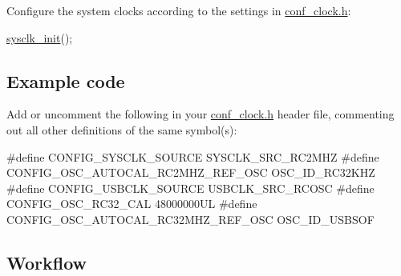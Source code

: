\begin{DoxyEnumerate}
\item Configure the system clocks according to the settings in \hyperlink{conf__clock_8h}{conf\-\_\-clock.\-h}\-: 
\begin{DoxyCode}
 \hyperlink{group__sysclk__group_ga242399e48a97739c88b4d0c00f6101de}{sysclk\_init}(); 
\end{DoxyCode}

\end{DoxyEnumerate}\hypertarget{sysclk_quickstart_use_case_3_sysclk_quickstart_use_case_3_example_code}{}\subsection{Example code}\label{sysclk_quickstart_use_case_3_sysclk_quickstart_use_case_3_example_code}
Add or uncomment the following in your \hyperlink{conf__clock_8h}{conf\-\_\-clock.\-h} header file, commenting out all other definitions of the same symbol(s)\-: 
\begin{DoxyCode}
\textcolor{preprocessor}{           #define CONFIG\_SYSCLK\_SOURCE                SYSCLK\_SRC\_RC2MHZ}
\textcolor{preprocessor}{}
\textcolor{preprocessor}{           #define CONFIG\_OSC\_AUTOCAL\_RC2MHZ\_REF\_OSC   OSC\_ID\_RC32KHZ}
\textcolor{preprocessor}{}
\textcolor{preprocessor}{           #define CONFIG\_USBCLK\_SOURCE                USBCLK\_SRC\_RCOSC}
\textcolor{preprocessor}{}\textcolor{preprocessor}{           #define CONFIG\_OSC\_RC32\_CAL                 48000000UL}
\textcolor{preprocessor}{           #define CONFIG\_OSC\_AUTOCAL\_RC32MHZ\_REF\_OSC  OSC\_ID\_USBSOF}
\end{DoxyCode}
\hypertarget{sysclk_quickstart_use_case_3_sysclk_quickstart_use_case_3_example_workflow}{}\subsection{Workflow}\label{sysclk_quickstart_use_case_3_sysclk_quickstart_use_case_3_example_workflow}


